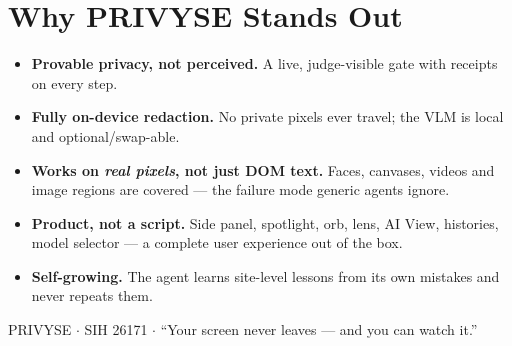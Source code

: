 \documentclass[11pt,a4paper]{article}
\begin{document}
\section{Why PRIVYSE Stands Out}

\begin{itemize}
  \item \textbf{Provable privacy, not perceived.} A live, judge-visible gate
        with receipts on every step.
  \item \textbf{Fully on-device redaction.} No private pixels ever travel; the
        VLM is local and optional/swap-able.
  \item \textbf{Works on \emph{real pixels}, not just DOM text.} Faces,
        canvases, videos and image regions are covered --- the failure mode
        generic agents ignore.
  \item \textbf{Product, not a script.} Side panel, spotlight, orb, lens, AI
        View, histories, model selector --- a complete user experience out of
        the box.
  \item \textbf{Self-growing.} The agent learns site-level lessons from its
        own mistakes and never repeats them.
\end{itemize}

\vspace{8pt}
\begin{center}
{\color{dim}\small PRIVYSE $\cdot$ SIH 26171 $\cdot$ ``Your screen never leaves
--- and you can watch it.''}
\end{center}
\end{document}
